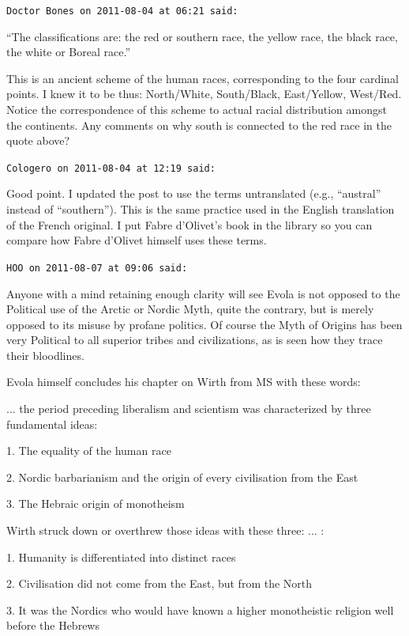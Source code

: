 \begin{footnotesize}
\begin{sffamily}
\texttt{Doctor Bones on 2011-08-04 at 06:21 said:}

``The classifications are: the red or southern race, the yellow race, the black race, the white or Boreal race.''

This is an ancient scheme of the human races, corresponding to the four cardinal points. I knew it to be thus: North/White, South/Black, East/Yellow, West/Red. Notice the correspondence of this scheme to actual racial distribution amongst the continents. Any comments on why south is connected to the red race in the quote above?

\hfill

\texttt{Cologero on 2011-08-04 at 12:19 said:}

Good point. I updated the post to use the terms untranslated (e.g., ``austral'' instead of ``southern''). This is the same practice used in the English translation of the French original. I put Fabre d'Olivet's book in the library so you can compare how Fabre d'Olivet himself uses these terms.

\hfill

\texttt{HOO on 2011-08-07 at 09:06 said:}

Anyone with a mind retaining enough clarity will see Evola is not opposed to the Political use of the Arctic or Nordic Myth, quite the contrary, but is merely opposed to its misuse by profane politics. Of course the Myth of Origins has been very Political to all superior tribes and civilizations, as is seen how they trace their bloodlines.

Evola himself concludes his chapter on Wirth from MS with these words:

... the period preceding liberalism and scientism was characterized by three fundamental ideas:

1. The equality of the human race

2. Nordic barbarianism and the origin of every civilisation from the East

3. The Hebraic origin of monotheism

Wirth struck down or overthrew those ideas with these three: ... :

1. Humanity is differentiated into distinct races

2. Civilisation did not come from the East, but from the North

3. It was the Nordics who would have known a higher monotheistic religion well before the Hebrews


\end{sffamily}
\end{footnotesize}
